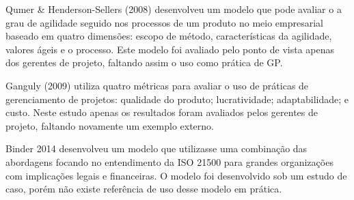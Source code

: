Qumer \& Henderson-Sellers (2008) desenvolveu um modelo que pode avaliar o a grau de agilidade seguido nos processos de um produto no meio empresarial baseado em quatro dimensões: escopo de método, características da agilidade, valores ágeis e o processo. Este modelo foi avaliado pelo ponto de vista apenas dos gerentes de projeto, faltando assim o uso como prática de GP.

Ganguly (2009) utiliza quatro métricas para avaliar o uso de práticas de gerenciamento de projetos: qualidade do produto; lucratividade; adaptabilidade; e custo. Neste estudo apenas os resultados foram avaliados pelos gerentes de projeto, faltando novamente um exemplo externo.

Binder 2014 desenvolveu um modelo que utilizasse uma combinação das abordagens focando no entendimento da ISO 21500 para grandes organizações com implicações legais e financeiras. O modelo foi desenvolvido sob um estudo de caso, porém não existe referência de uso desse modelo em prática.

